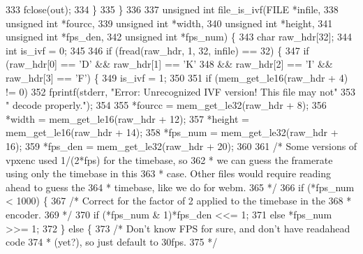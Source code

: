 \begin{DoxyCodeInclude}
{{{{{{{{{333     fclose(out);
334   \}
335 \}
336 
337 \textcolor{keywordtype}{unsigned} \textcolor{keywordtype}{int} file\_is\_ivf(FILE *infile,
338                          \textcolor{keywordtype}{unsigned} \textcolor{keywordtype}{int} *fourcc,
339                          \textcolor{keywordtype}{unsigned} \textcolor{keywordtype}{int} *width,
340                          \textcolor{keywordtype}{unsigned} \textcolor{keywordtype}{int} *height,
341                          \textcolor{keywordtype}{unsigned} \textcolor{keywordtype}{int} *fps\_den,
342                          \textcolor{keywordtype}{unsigned} \textcolor{keywordtype}{int} *fps\_num) \{
343   \textcolor{keywordtype}{char} raw\_hdr[32];
344   \textcolor{keywordtype}{int} is\_ivf = 0;
345 
346   \textcolor{keywordflow}{if} (fread(raw\_hdr, 1, 32, infile) == 32) \{
347     \textcolor{keywordflow}{if} (raw\_hdr[0] == \textcolor{charliteral}{'D'} && raw\_hdr[1] == \textcolor{charliteral}{'K'}
348         && raw\_hdr[2] == \textcolor{charliteral}{'I'} && raw\_hdr[3] == \textcolor{charliteral}{'F'}) \{
349       is\_ivf = 1;
350 
351       \textcolor{keywordflow}{if} (mem\_get\_le16(raw\_hdr + 4) != 0)
352         fprintf(stderr, \textcolor{stringliteral}{"Error: Unrecognized IVF version! This file may not"}
353                 \textcolor{stringliteral}{" decode properly."});
354 
355       *fourcc = mem\_get\_le32(raw\_hdr + 8);
356       *width = mem\_get\_le16(raw\_hdr + 12);
357       *height = mem\_get\_le16(raw\_hdr + 14);
358       *fps\_num = mem\_get\_le32(raw\_hdr + 16);
359       *fps\_den = mem\_get\_le32(raw\_hdr + 20);
360 
361       \textcolor{comment}{/* Some versions of vpxenc used 1/(2*fps) for the timebase, so}
362 \textcolor{comment}{       * we can guess the framerate using only the timebase in this}
363 \textcolor{comment}{       * case. Other files would require reading ahead to guess the}
364 \textcolor{comment}{       * timebase, like we do for webm.}
365 \textcolor{comment}{       */}
366       \textcolor{keywordflow}{if} (*fps\_num < 1000) \{
367         \textcolor{comment}{/* Correct for the factor of 2 applied to the timebase in the}
368 \textcolor{comment}{         * encoder.}
369 \textcolor{comment}{         */}
370         \textcolor{keywordflow}{if} (*fps\_num & 1)*fps\_den <<= 1;
371         \textcolor{keywordflow}{else} *fps\_num >>= 1;
372       \} \textcolor{keywordflow}{else} \{
373         \textcolor{comment}{/* Don't know FPS for sure, and don't have readahead code}
374 \textcolor{comment}{         * (yet?), so just default to 30fps.}
375 \textcolor{comment}{         */}
}}}}}}}}}
\end{DoxyCodeInclude}
